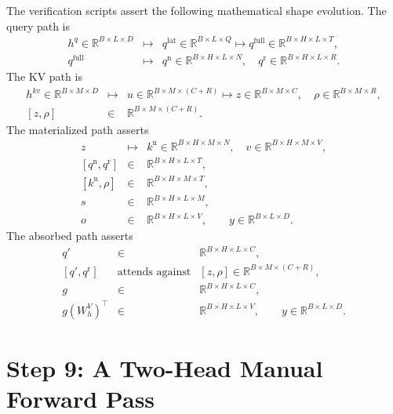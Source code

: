 \documentclass[11pt]{article}
\newcommand{\R}{\mathbb{R}}
\begin{document}
The verification scripts assert the following mathematical shape evolution.
The query path is
\[
\begin{array}{rcl}
  h^q\in\R^{B\times L\times D}
  &\longmapsto&
  q^{\mathrm{lat}}\in\R^{B\times L\times Q}
  \longmapsto
  q^{\mathrm{full}}\in\R^{B\times H\times L\times T},
  \\[2pt]
  q^{\mathrm{full}}
  &\longmapsto&
  q^{\mathrm n}\in\R^{B\times H\times L\times N},
  \quad
  q^{\mathrm r}\in\R^{B\times H\times L\times R}.
\end{array}
\]
The KV path is
\[
\begin{array}{rcl}
  h^{kv}\in\R^{B\times M\times D}
  &\longmapsto&
  u\in\R^{B\times M\times(C+R)}
  \longmapsto
  z\in\R^{B\times M\times C},
  \quad
  \rho\in\R^{B\times M\times R},
  \\[2pt]
  [z,\rho]
  &\in&
  \R^{B\times M\times(C+R)}.
\end{array}
\]
The materialized path asserts
\[
\begin{array}{rcl}
  z
  &\longmapsto&
  k^{\mathrm n}\in\R^{B\times H\times M\times N},
  \quad
  v\in\R^{B\times H\times M\times V},
  \\[2pt]
  [q^{\mathrm n},q^{\mathrm r}]
  &\in&
  \R^{B\times H\times L\times T},
  \\[2pt]
  [k^{\mathrm n},\rho]
  &\in&
  \R^{B\times H\times M\times T},
  \\[2pt]
  s
  &\in&
  \R^{B\times H\times L\times M},
  \\[2pt]
  o
  &\in&
  \R^{B\times H\times L\times V},
  \qquad
  y\in\R^{B\times L\times D}.
\end{array}
\]
The absorbed path asserts
\[
\begin{array}{rcl}
  q'
  &\in&
  \R^{B\times H\times L\times C},
  \\[2pt]
  [q',q^{\mathrm r}]
  &\text{attends against}&
  [z,\rho]\in\R^{B\times M\times(C+R)},
  \\[2pt]
  g
  &\in&
  \R^{B\times H\times L\times C},
  \\[2pt]
  g(W^V_h)^\top
  &\in&
  \R^{B\times H\times L\times V},
  \qquad
  y\in\R^{B\times L\times D}.
\end{array}
\]

\section{Step 9: A Two-Head Manual Forward Pass}
\end{document}
